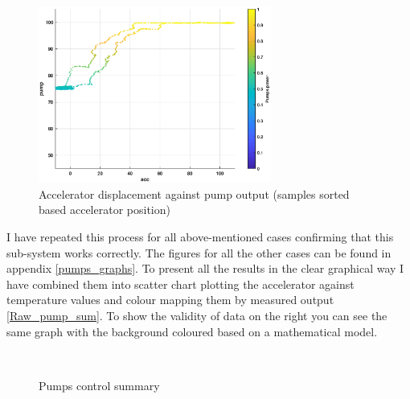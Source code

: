 \begin{figure}[h]
    \centering
    \includegraphics[height=5.8cm]{figures/pump_50_1.eps}
    \caption[Accelerator displacement against pump output]{Accelerator displacement against pump output (samples sorted based accelerator position)}
    \label{pump_50_1}
\end{figure}

I have repeated this process for all above-mentioned cases confirming that this sub-system works correctly. The figures for all the other cases can be found in appendix \ref{pumps_graphs}. To present all the results in the clear graphical way I have combined them into scatter chart plotting the accelerator against temperature values and colour mapping them by measured output \ref{Raw_pump_sum}. To show the validity of data on the right you can see the same graph with the background coloured based on a mathematical model.

\begin{figure}[h]
    \centering
        ~
        \caption{Pumps control summary}
    \label{Pump_sum}
\end{figure}


